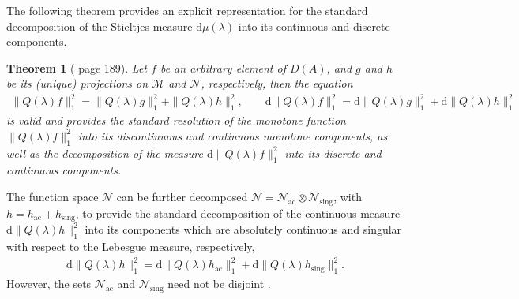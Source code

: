 \documentclass[11pt]{amsart}
\renewcommand{\d}{\mathrm{d}}
\renewcommand{\Mc}{\mathcal{M}}
\newcommand{\Nc}{\mathcal{N}}
\newtheorem{theorem}{Theorem}[section]
\begin{document}
The following theorem \cite{Stone:64} provides an explicit
representation for the standard decomposition of the Stieltjes measure
$\d\mu(\lambda)$ into its continuous and discrete components.
%
\begin{theorem}[\cite{Stone:64} page 189]
Let $f$ be an arbitrary element of $D(A)$, and $g$ and $h$ be its (unique)
projections on $\Mc$ and $\Nc$, respectively, then the equation
%
\begin{align}
  \|Q(\lambda)f\|_1^2=\|Q(\lambda)g\|_1^2+\|Q(\lambda)h\|_1^2, \qquad
  \d\|Q(\lambda)f\|_1^2=\d\|Q(\lambda)g\|_1^2+\d\|Q(\lambda)h\|_1^2
\end{align}
%
is valid and provides the standard resolution of the monotone function
$\|Q(\lambda)f\|_1^2$ into its discontinuous and continuous monotone
components, as well as the decomposition of the measure
$\d\|Q(\lambda)f\|_1^2$ into its discrete and continuous components.  
\end{theorem}
%
\noindent
The function space $\Nc$ can be further decomposed \cite{Reed-1980}
$\Nc=\Nc_{\text{ac}}\otimes\Nc_{\text{sing}}$, with
$h=h_{\text{ac}}+h_{\text{sing}}$, to provide the standard
\cite{Folland:99} decomposition of the continuous measure
$\d\|Q(\lambda)h\|_1^2$ into its components which are absolutely continuous
and singular with respect to the Lebesgue measure, respectively,
%
\begin{align}
  \d\|Q(\lambda)h\|_1^2=\d\|Q(\lambda)h_{\text{ac}}\|_1^2+\d\|Q(\lambda)h_{\text{sing}}\|_1^2.
\end{align}
%
However, the sets $\Nc_{\text{ac}}$ and $\Nc_{\text{sing}}$ need not
be disjoint \cite{Reed-1980}. 
\end{document}
